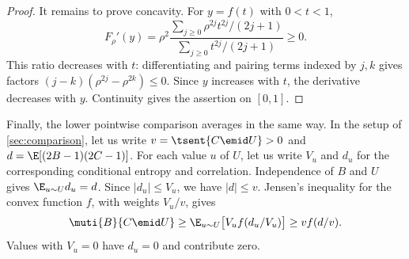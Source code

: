 \begin{proof}
It remains to prove concavity. For $y=f(t)$ with $0<t<1$,
\begin{equation*}
  F_\rho'(y)=\rho^2
  \frac{\sum_{j\ge0}\rho^{2j}t^{2j}/(2j+1)}
  {\sum_{j\ge0}t^{2j}/(2j+1)}\ge0.
\end{equation*}
This ratio decreases with $t$: differentiating and pairing
terms indexed by $j,k$ gives factors
$(j-k)(\rho^{2j}-\rho^{2k})\le0$.
Since $y$ increases with $t$, the derivative decreases with $y$.
Continuity gives the assertion on $[0,1]$.
\end{proof}

Finally, the lower pointwise comparison averages in the same way.
In the setup of \autoref{sec:comparison}, let us write
$v=\tsent{C\emid U}>0$ and
$d=\E[(2B-1)(2C-1)]$.
For each value $u$ of $U$, let us write $V_u$ and $d_u$ for the
corresponding conditional entropy and correlation.
Independence of $B$ and $U$ gives $\E_{u\sim U}d_u=d$.
Since $|d_u|\le V_u$, we have $|d|\le v$.
Jensen's inequality for the convex function $f$, with weights
$V_u/v$, gives
\begin{equation*}
  \muti{B}{C\emid U}
  \ge\E_{u\sim U}\bigl[V_u f(d_u/V_u)\bigr]
  \ge v f(d/v).
\end{equation*}
Values with $V_u=0$ have $d_u=0$ and contribute zero.
